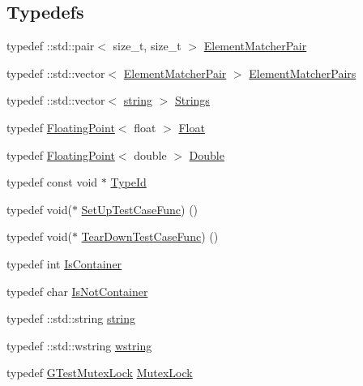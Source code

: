 \subsection*{Typedefs}
\begin{DoxyCompactItemize}
\item 
typedef \+::std\+::pair$<$ size\+\_\+t, size\+\_\+t $>$ \hyperlink{namespacetesting_1_1internal_a109863545f08651178bf0f520aebd33b}{Element\+Matcher\+Pair}
\item 
typedef \+::std\+::vector$<$ \hyperlink{namespacetesting_1_1internal_a109863545f08651178bf0f520aebd33b}{Element\+Matcher\+Pair} $>$ \hyperlink{namespacetesting_1_1internal_a0038618710c01a71150887dc7cfb0a29}{Element\+Matcher\+Pairs}
\item 
typedef \+::std\+::vector$<$ \hyperlink{namespacetesting_1_1internal_a8e8ff5b11e64078831112677156cb111}{string} $>$ \hyperlink{namespacetesting_1_1internal_a7706b17f05f4b49e351b052ae4e05073}{Strings}
\item 
typedef \hyperlink{classtesting_1_1internal_1_1_floating_point}{Floating\+Point}$<$ float $>$ \hyperlink{namespacetesting_1_1internal_a02e1981f5ff70609e6ac06e006ff519a}{Float}
\item 
typedef \hyperlink{classtesting_1_1internal_1_1_floating_point}{Floating\+Point}$<$ double $>$ \hyperlink{namespacetesting_1_1internal_a66a7579b1893b260c31dad577f7a5c48}{Double}
\item 
typedef const void $\ast$ \hyperlink{namespacetesting_1_1internal_ab1114197d3c657d8b7f8e0c5caa12d00}{Type\+Id}
\item 
typedef void($\ast$ \hyperlink{namespacetesting_1_1internal_a30037044c0b57cdd647c7e2e97cb2cff}{Set\+Up\+Test\+Case\+Func}) ()
\item 
typedef void($\ast$ \hyperlink{namespacetesting_1_1internal_a085e31321d0d029c04d2a79234f60c1a}{Tear\+Down\+Test\+Case\+Func}) ()
\item 
typedef int \hyperlink{namespacetesting_1_1internal_ad8f0c2883245f1df2a53618a49f0deb3}{Is\+Container}
\item 
typedef char \hyperlink{namespacetesting_1_1internal_abf080521ce135deb510e0a7830fd3d33}{Is\+Not\+Container}
\item 
typedef \+::std\+::string \hyperlink{namespacetesting_1_1internal_a8e8ff5b11e64078831112677156cb111}{string}
\item 
typedef \+::std\+::wstring \hyperlink{namespacetesting_1_1internal_a3f543179329c353aee1d7b54a9a8e335}{wstring}
\item 
typedef \hyperlink{classtesting_1_1internal_1_1_g_test_mutex_lock}{G\+Test\+Mutex\+Lock} \hyperlink{namespacetesting_1_1internal_a08b187c6cc4e28400aadf9a32fccc8de}{Mutex\+Lock}

\end{DoxyCompactItemize}
